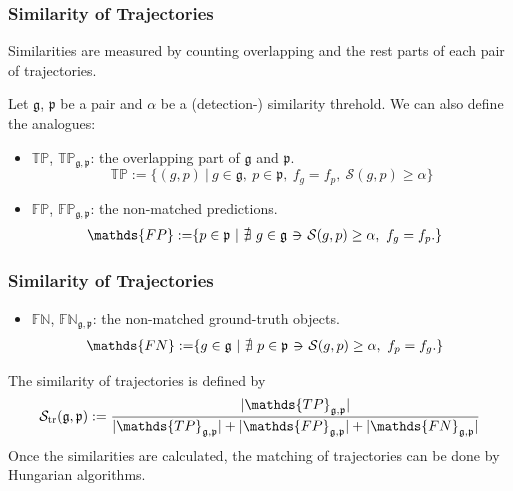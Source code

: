 \documentclass[slidetop, mathserif]{beamer}
\newcommand{\suchthat}{-\hspace{-10pt}\ni\hspace{-10pt}-}
\begin{document}
\begin{frame}
	\frametitle{Similarity of Trajectories}
			
	Similarities are measured
	by counting overlapping and the rest parts of each pair of trajectories.
			
	\vspace{5pt}
			
	Let $\mathfrak g$, $\mathfrak p$ be a pair
	and $\alpha$ be a (detection-) similarity threhold.
	We can also define the analogues:

	\vspace{5pt}

	\begin{itemize}
		\item $\mathds{TP}$, $\mathds{TP}_{\mathfrak g, \mathfrak p}$:
		      the overlapping part of $\mathfrak g$ and $\mathfrak p$.
		      \[
		      	\mathds{TP} := \{(g,p)\ |\ 
		      	g\in\mathfrak g,~
		      	p\in\mathfrak p,~
		      	f_g=f_p,~ \mathcal S(g,p)\geq \alpha\}
		      \]
		\item $\mathds{FP}$, $\mathds{FP}_{\mathfrak g, \mathfrak p}$:
		      the non-matched predictions.
		      \begin{align*}
		      	\mathds{FP} := & \{ p\in\mathfrak p\ |\ 
		      	\nexists\ g\in\mathfrak g ~\suchthat~ \mathcal S(g,p)\geq\alpha,~ f_g=f_p.\}
		      \end{align*}
	\end{itemize}
			
\end{frame}

\begin{frame}
	\frametitle{Similarity of Trajectories}
			
	\begin{itemize}
		\item $\mathds{FN}$, $\mathds{FN}_{\mathfrak g, \mathfrak p}$: the non-matched ground-truth objects.
		      \begin{align*}
		      	\mathds{FN} := & \{ g\in\mathfrak g\ |\ 
		      	\nexists\ p\in\mathfrak p ~\suchthat~ \mathcal S(g,p)\geq\alpha,~ f_p=f_g.\}
		      \end{align*}
	\end{itemize}
			
	The similarity of trajectories is defined by
	\[
		\mathcal S_{\rm tr}(\mathfrak g, \mathfrak p) :=
		\dfrac{|\mathds{TP}_{\mathfrak g,\mathfrak p}|}{
			|\mathds{TP}_{\mathfrak g,\mathfrak p}|+|\mathds{FP}_{\mathfrak g,\mathfrak p}|+|\mathds{FN}_{\mathfrak g,\mathfrak p}|
		}
	\]
	Once the similarities are calculated,
	the matching of trajectories can be done by Hungarian algorithms.
\end{frame}
\end{document}
